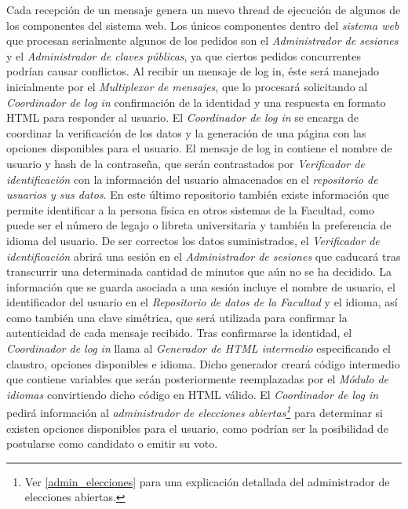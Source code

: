 Cada recepción de un mensaje genera un nuevo thread de ejecución de algunos de los componentes del sistema web. Los únicos componentes dentro del \emph{sistema web} que procesan serialmente algunos de los pedidos son el  \emph{Administrador de sesiones} y el \emph{Administrador de claves públicas}, ya que ciertos pedidos concurrentes podrían causar conflictos.
Al recibir un mensaje de log in, éste será manejado inicialmente por el \emph{Multiplexor de mensajes}, que lo procesará solicitando al \emph{Coordinador de log in} confirmación de la identidad y una respuesta en formato HTML para responder al usuario. El \emph{Coordinador de log in} se encarga de coordinar la verificación de los datos y la generación de una página con las opciones disponibles para el usuario. 
El mensaje de log in contiene el nombre de usuario y hash de la contraseña, que serán contrastados por \emph{Verificador de identificación} con la información del usuario almacenados en el \emph{repositorio de usuarios y sus datos}. En este último repositorio también existe información que permite identificar a la persona física en otros sistemas de la Facultad, como puede ser el número de legajo o libreta universitaria y también la preferencia de idioma del usuario. 
De ser correctos los datos suministrados, el \emph{Verificador de identificación} abrirá una sesión en el \emph{Administrador de sesiones} que caducará tras transcurrir una determinada cantidad de minutos que aún no se ha decidido.
La información que se guarda asociada a una sesión incluye el nombre de usuario, el identificador del usuario en el \emph{Repositorio de datos de la Facultad} y el idioma, así como también una clave simétrica, que será utilizada para confirmar la autenticidad de cada mensaje recibido.  
Tras confirmarse la identidad, el \emph{Coordinador de log in} llama al \emph{Generador de HTML intermedio} especificando el claustro, opciones disponibles e idioma. Dicho generador creará código intermedio que contiene variables que serán posteriormente reemplazadas por el \emph{Módulo de idiomas} convirtiendo dicho código en HTML válido. 
El \emph{Coordinador de log in} pedirá información al \emph{administrador de elecciones abiertas\footnote{Ver \ref{admin_elecciones} para una explicación detallada del administrador de elecciones abiertas.}} para determinar si existen opciones disponibles para el usuario, como podrían ser la posibilidad de postularse como candidato o emitir su voto.




